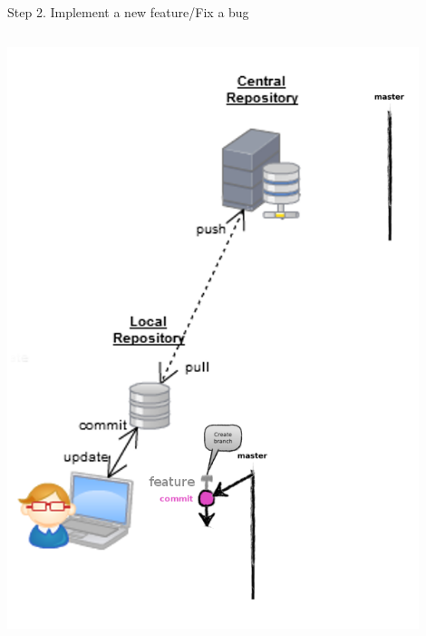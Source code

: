 \begin{frame}[fragile]{Step 2. Implement a new feature/Fix a bug}
\begin{columns}
\begin{column}{0.4\textwidth}
\begin{center}
{				\includegraphics[width=0.9\textwidth]{branch_commit.png}
			}
		\end{center}
	\end{column}
\end{columns}
\end{frame}


